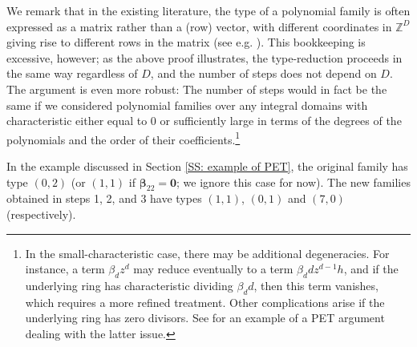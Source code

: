 \documentclass[11pt]{amsart}
\theoremstyle{definition}
\newcommand{\Z}{{\mathbb Z}}
\newcommand{\bbeta}{{\boldsymbol{\beta}}}
\begin{document}
We remark that in the existing literature, the type of a polynomial family is often expressed as a matrix rather than a (row) vector, with different coordinates in $\Z^D$ giving rise to different rows in the matrix (see e.g. \cite{BL96, CFH11, DKS22}). This bookkeeping is excessive, however; as the above proof illustrates, the type-reduction proceeds in the same way regardless of $D$, and the number of steps does not depend on $D$. The argument is even more robust: The number of steps would in fact be the same if we considered polynomial families over any integral domains with characteristic either equal to $0$ or sufficiently large in terms of the degrees of the polynomials and the order of their coefficients.\footnote{In the small-characteristic case, there may be additional degeneracies. For instance, a term $\beta_d z^d$ may reduce eventually to a term $\beta_d d z^{d-1}h$, and if the underlying ring has characteristic dividing $\beta_d d$, then this term vanishes, which requires a more refined treatment. Other complications arise if the underlying ring has zero divisors. See \cite{BB23} for an example of a PET argument dealing with the latter issue.}



        In the example discussed in Section \ref{SS: example of PET}, the original family has type $(0,2)$ (or $(1,1)$ if $\bbeta_{22}=\textbf{0}$; we ignore this case for now). The new families obtained in steps 1, 2, and 3 have types $(1,1)$,
        $(0,1)$ and $(7,0)$ (respectively).


    
   
\end{document}
